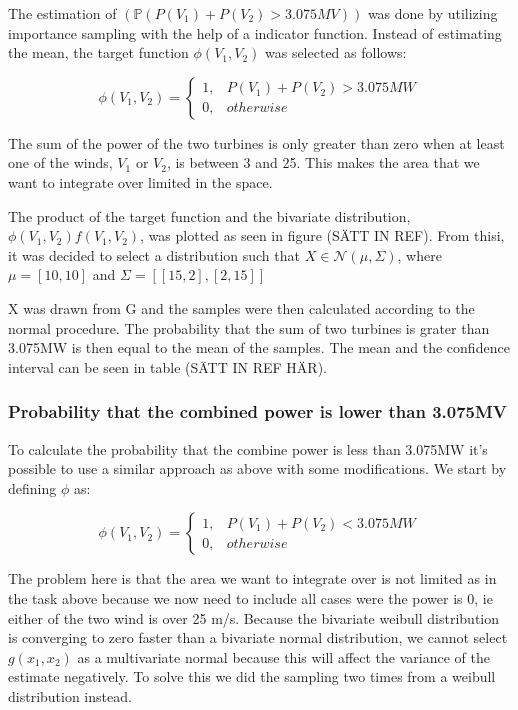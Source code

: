 \documentclass[a4paper]{article}
\begin{document}
The estimation of $(\mathbb{P}(P(V_1) + P(V_2) > 3.075MV))$ was done by utilizing importance sampling with the help of a indicator function. Instead of estimating the mean, the target function $\phi(V_1, V_2)$ was selected as follows:

\begin{equation}
    \phi(V_1, V_2)=\begin{cases}
        1, & P(V_1) + P(V_2) > 3.075MW\\ 
        0, & otherwise 
    \end{cases}
\end{equation}

The sum of the power of the two turbines is only greater than zero when at least one of the winds, $V_1$ or $V_2$, is between 3 and 25. This makes the area that we want to integrate over limited in the space. 

The product of the target function and the bivariate distribution, $\phi(V_1, V_2)f(V_1, V_2)$, was plotted as seen in figure (SÄTT IN REF). From thisi, it was decided to select a distribution such that $X \in \mathcal{N}(\mu, \Sigma)$, where $\mu = [10,10]$ and $\Sigma = [[15, 2], [2, 15]]$

X was drawn from G and the samples were then calculated according to the normal procedure. The probability that the sum of two turbines is grater than 3.075MW is then equal to the mean of the samples. The mean and the confidence interval can be seen in table (SÄTT IN REF HÄR).

\subsubsection*{Probability that the combined power is lower than 3.075MV}

To calculate the probability that the combine power is less than 3.075MW it's possible to use a similar approach as above with some modifications. We start by defining $\phi$ as:

\begin{equation}
    \phi(V_1, V_2)=\begin{cases}
        1, & P(V_1) + P(V_2) < 3.075MW\\ 
        0, & otherwise 
    \end{cases}
\end{equation}

The problem here is that the area we want to integrate over is not limited as in the task above because we now need to include all cases were the power is 0, ie either of the two wind is over 25 m/s. Because the bivariate weibull distribution is converging to zero faster than a bivariate normal distribution, we cannot select $g(x_1, x_2)$ as a multivariate normal because this will affect the variance of the estimate negatively. To solve this we did the sampling two times from a weibull distribution instead.
\end{document}
